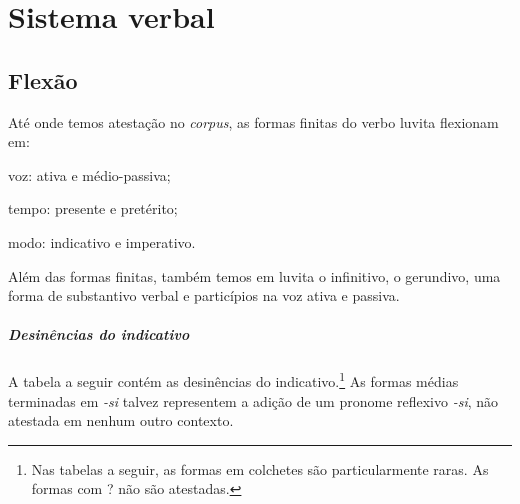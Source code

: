 
\chapter{Sistema verbal}

\section{Flexão}

Até onde temos atestação no \emph{corpus}, as formas finitas do verbo luvita
flexionam em:
\begin{inparaenum}[(a)]
	\item voz: ativa e médio-passiva;
	\item tempo: presente e pretérito;
	\item modo: indicativo e imperativo.
\end{inparaenum}
Além das formas finitas, também temos em luvita o infinitivo, o gerundivo, uma
forma de substantivo verbal e particípios na voz ativa e passiva.

\paragraph{Desinências do indicativo}
A tabela a seguir contém as desinências do indicativo.\footnote{Nas tabelas a
	seguir, as formas em colchetes são particularmente raras. As formas com {?} não
	são atestadas.}
As formas médias terminadas em \emph{-si} talvez representem a adição de um
pronome reflexivo \emph{-si}, não atestada em nenhum outro contexto.


